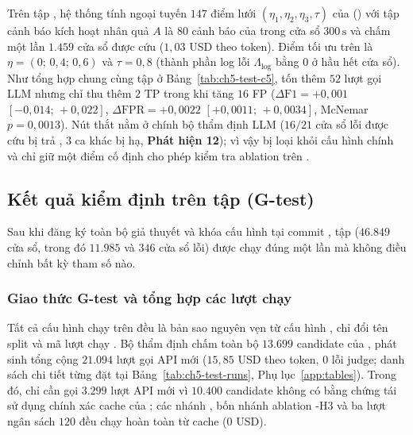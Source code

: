 Trên tập , hệ thống tính ngoại tuyến $147$ điểm lưới $(\eta_1, \eta_2, \eta_3, \tau)$ của  () với tập cảnh báo kích hoạt nhân quả $A$ là $80$ cảnh báo của \CTAV{} trong cửa sổ $300\,\text{s}$ và chấm một lần $1.459$ cửa sổ được cứu ($1{,}03$ USD theo token). Điểm tối ưu trên  là $\eta = (0;\, 0{,}4;\, 0{,}6)$ và $\tau = 0{,}8$ (thành phần log lỗi $\Lambda_{\text{log}}$ bằng $0$ ở hầu hết cửa sổ). Như tổng hợp chung cùng tập  ở Bảng~\ref{tab:ch5-test-c5},  tốn thêm $52$ lượt gọi LLM nhưng chỉ thu thêm $2$ TP trong khi tăng $16$ FP ($\Delta\text{F1} = +0{,}001$ $[-0{,}014;\, +0{,}022]$, $\Delta\text{FPR} = +0{,}0022$ $[+0{,}0011;\, +0{,}0034]$, McNemar $p = 0{,}0013$). Nút thắt nằm ở chính bộ thẩm định LLM ($16/21$ cửa sổ lỗi được cứu bị  trả , $3$ ca khác bị  hạ, \textbf{Phát hiện 12}); vì vậy  bị loại khỏi cấu hình \CTAV{} chính và chỉ giữ một điểm cố định cho phép kiểm tra ablation trên .

\subsection{Kết quả kiểm định trên tập  (G-test)}
\label{sec:ch5-test}

Sau khi đăng ký toàn bộ giả thuyết và khóa cấu hình tại commit , tập  ($46.849$ cửa sổ, trong đó $11.985$  và $346$ cửa sổ lỗi) được chạy đúng một lần mà không điều chỉnh bất kỳ tham số nào.

\subsubsection{Giao thức G-test và tổng hợp các lượt chạy}
\label{sec:ch5-test-protocol}

Tất cả cấu hình chạy trên  đều là bản sao nguyên vẹn từ cấu hình , chỉ đổi tên split và mã lượt chạy . Bộ thẩm định chấm toàn bộ $13.699$ candidate của , phát sinh tổng cộng $21.094$ lượt gọi API mới ($15{,}85$ USD theo token, $0$ lỗi judge; danh sách chi tiết từng  đặt tại Bảng~\ref{tab:ch5-test-runs}, Phụ lục~\ref{app:tables}). Trong đó,  chỉ cần gọi $3.299$ lượt API mới vì $10.400$ candidate không có bằng chứng tái sử dụng chính xác cache của ; các nhánh \CTAV{}, bốn nhánh ablation \hyp{H3} và ba lượt ngân sách $120$ đều chạy hoàn toàn từ cache ($0$ USD).

